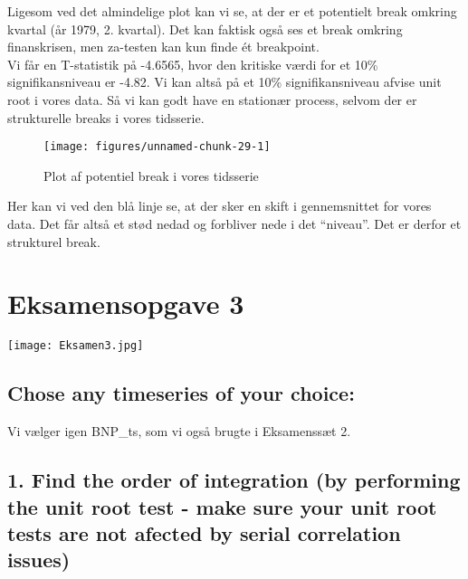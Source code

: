 \documentclass[
  10pt,
]{article}
\begin{document}
Ligesom ved det almindelige plot kan vi se, at der er et potentielt
break omkring kvartal (år 1979, 2. kvartal). Det kan faktisk også ses et
break omkring finanskrisen, men za-testen kan kun finde ét breakpoint.\\

Vi får en T-statistik på -4.6565, hvor den kritiske værdi for et 10\%
signifikansniveau er -4.82. Vi kan altså på et 10\% signifikansniveau
afvise unit root i vores data. Så vi kan godt have en stationær process,
selvom der er strukturelle breaks i vores tidsserie.

\begin{figure}[H]

{\centering \texttt{[image: figures/unnamed-chunk-29-1]} 

}

\caption{\label{fig:bnpbreak}Plot af potentiel break i vores tidsserie}\label{fig:unnamed-chunk-29}
\end{figure}

Her kan vi ved den blå linje se, at der sker en skift i gennemsnittet
for vores data. Det får altså et stød nedad og forbliver nede i det
``niveau''. Det er derfor et strukturel break.

\newpage

\hypertarget{eksamensopgave-3}{%
\section{Eksamensopgave 3}\label{eksamensopgave-3}}

\texttt{[image: Eksamen3.jpg]} \newpage

\hypertarget{chose-any-timeseries-of-your-choice}{%
\subsection{Chose any timeseries of your
choice:}\label{chose-any-timeseries-of-your-choice}}

Vi vælger igen BNP\_ts, som vi også brugte i Eksamenssæt 2.

\hypertarget{find-the-order-of-integration-by-performing-the-unit-root-test---make-sure-your-unit-root-tests-are-not-afected-by-serial-correlation-issues}{%
\subsection{1. Find the order of integration (by performing the unit
root test - make sure your unit root tests are not afected by serial
correlation
issues)}\label{find-the-order-of-integration-by-performing-the-unit-root-test---make-sure-your-unit-root-tests-are-not-afected-by-serial-correlation-issues}}
\end{document}
